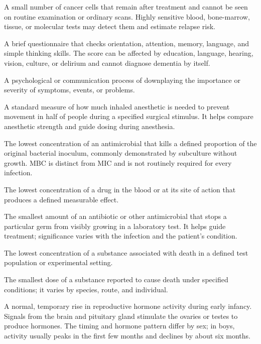  A small number of cancer cells that remain after treatment and cannot be seen on routine examination or ordinary scans. Highly sensitive blood, bone-marrow, tissue, or molecular tests may detect them and estimate relapse risk.

 A brief questionnaire that checks orientation, attention, memory, language, and simple thinking skills. The score can be affected by education, language, hearing, vision, culture, or delirium and cannot diagnose dementia by itself.

 A psychological or communication process of downplaying the importance or severity of symptoms, events, or problems.

 A standard measure of how much inhaled anesthetic is needed to prevent movement in half of people during a specified surgical stimulus. It helps compare anesthetic strength and guide dosing during anesthesia.

 The lowest concentration of an antimicrobial that kills a defined proportion of the
original bacterial inoculum, commonly demonstrated by subculture without growth. MBC is
distinct from MIC and is not routinely required for every infection.

 The lowest concentration of a drug in the blood or at its site of action that produces
a defined measurable effect.

 The smallest amount of an antibiotic or other antimicrobial that stops a particular germ from visibly growing in a laboratory test. It helps guide treatment; significance varies with the infection and the patient's condition.

 The lowest concentration of a substance associated with death in a defined test
population or experimental setting.

 The smallest dose of a substance reported to cause death under specified conditions; it varies by species, route, and individual.

 A normal, temporary rise in reproductive hormone activity during early infancy. Signals from the brain and pituitary gland stimulate the ovaries or testes to produce hormones. The timing and hormone pattern differ by sex; in boys, activity usually peaks in the first few months and declines by about six months.

